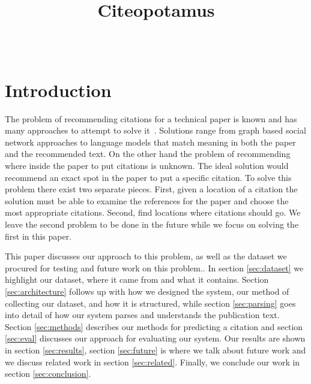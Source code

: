 \documentclass[10pt, conference, compsocconf]{IEEEtran}
\begin{document}
\title{Citeopotamus}


\author{
\\
}

\maketitle

\thispagestyle{empty}
\pagestyle{empty}

\section{Introduction}\label{sec:introduction}
The problem of recommending citations for a technical paper is known and has
many approaches to attempt to solve it~\cite{cite1, cite2, cite3, cite4, cite5,
cite6, cite7, cite8}. Solutions range from graph based social network
approaches to language models that match meaning in both the paper and the
recommended text. On the other hand the problem of recommending where inside the paper to put
citations is unknown. The ideal solution would recommend an exact spot in the
paper to put a specific citation. To solve this problem there exist two
separate pieces. First, given a location of a citation the solution must be
able to examine the references for the paper and choose the most appropriate
citations. Second, find locations where citations should go. We leave the
second problem to be done in the future while we focus on solving the first in
this paper.

This paper discusses our approach to this problem, as well as the dataset we
procured for testing and future work on this problem..
In section \ref{sec:dataset} we highlight our dataset,
where it came from and what it contains. Section \ref{sec:architecture} follows
up with how we designed the system, our method of collecting our dataset, and
how it is structured, while section \ref{sec:parsing} goes into detail of how
our system parses and understands the publication text. Section
\ref{sec:methods} describes our methods for predicting a citation and section
\ref{sec:eval} discusses our approach for evaluating our system. Our results
are shown in section \ref{sec:results}, section \ref{sec:future} is where we
talk about future work and we discuss related work in section
\ref{sec:related}. Finally, we conclude our work in section
\ref{sec:conclusion}.
\end{document}

